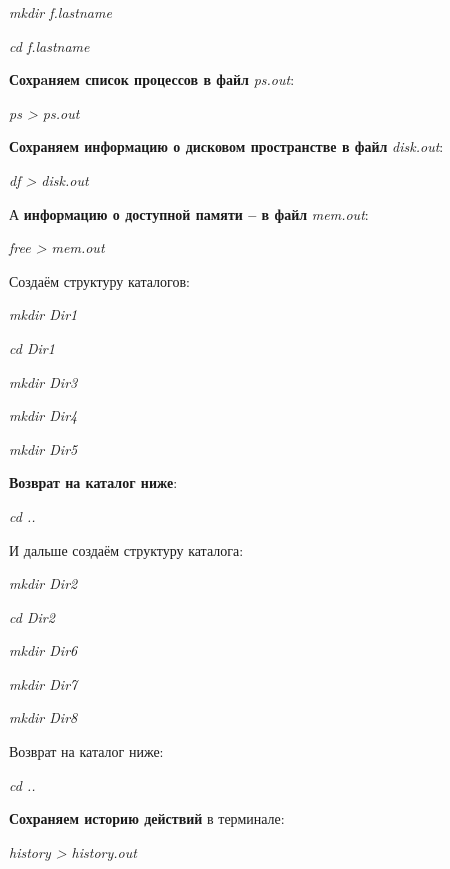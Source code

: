 \documentclass[a4paper, 14pt]{article}
\begin{document}
	\textit{mkdir f.lastname}
	
	\textit{cd f.lastname}
	
	\vspace{0.2cm}
	
	\textbf{Сохрaняем список процессов в файл} \textit{ps.out}:
	
	\textit{ps > ps.out}
	
	\vspace{0.2cm}
	
	\textbf{Сохраняем информацию о дисковом пространстве в файл} \textit{disk.out}:
	
	\textit{df > disk.out}
	
	\vspace{0.2cm}
	
	А \textbf{информацию о доступной памяти -- в файл} \textit{mem.out}:
	
	\textit{free > mem.out}
	
	\vspace{0.2cm}
	
	Создаём структуру каталогов:
	
	\textit{mkdir Dir1}
	
	\textit{cd Dir1}
	
	\textit{mkdir Dir3}
	
	\textit{mkdir Dir4}
	
	\textit{mkdir Dir5}
	
	\vspace{0.2cm}
	
	\textbf{Возврат на каталог ниже}:
	
	\textit{cd ..}
	
	\vspace{0.2cm}
	
	И дальше создаём структуру каталога:
	
	\textit{mkdir Dir2}
	
	\textit{cd Dir2}
	
	\textit{mkdir Dir6}
	
	\textit{mkdir Dir7}
	
	\textit{mkdir Dir8}

	\vspace{0.2cm}
	
	Возврат на каталог ниже:
	
	\textit{cd ..}
	
	\vspace{0.2cm}
	
	\textbf{Сохраняем историю действий} в терминале:
	
	\textit{history > history.out}
	
\end{document}
